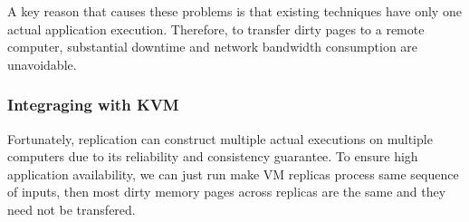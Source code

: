 A key reason that causes these problems is that existing techniques have only 
one actual application execution. Therefore, to transfer dirty pages to a 
remote computer, substantial downtime and network bandwidth consumption are 
unavoidable.





% 



\vspace{-.15in}\subsubsection{Integraging \falcon with KVM} 
\label{sec:vm-arch}\vspace{-.075in}







Fortunately, \paxos replication can construct multiple actual executions 
on multiple computers due to its reliability and consistency guarantee. To 
ensure high application availability, we can just run \paxos make VM replicas 
process same sequence of inputs, then most dirty memory pages across replicas 
are the same and they need not be transfered.

